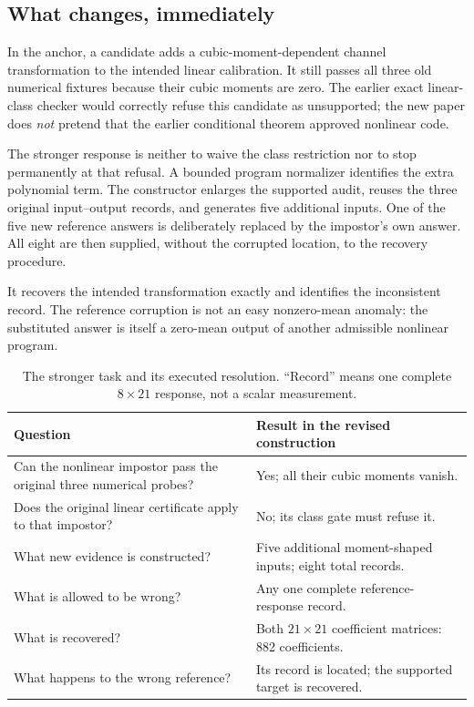 \documentclass[11pt,letterpaper]{article}
\theoremstyle{remark}\newtheorem{remark}{Remark}[section]
\begin{document}
\subsection{What changes, immediately}
In the anchor, a candidate adds a cubic-moment-dependent channel transformation to the intended linear calibration. It still passes all three old numerical fixtures because their cubic moments are zero. The earlier exact linear-class checker would correctly refuse this candidate as unsupported; the new paper does \emph{not} pretend that the earlier conditional theorem approved nonlinear code.

The stronger response is neither to waive the class restriction nor to stop permanently at that refusal. A bounded program normalizer identifies the extra polynomial term. The constructor enlarges the supported audit, reuses the three original input--output records, and generates five additional inputs. One of the five new reference answers is deliberately replaced by the impostor's own answer. All eight are then supplied, without the corrupted location, to the recovery procedure.

It recovers the intended transformation exactly and identifies the inconsistent record. The reference corruption is not an easy nonzero-mean anomaly: the substituted answer is itself a zero-mean output of another admissible nonlinear program.

\begin{table}[htbp]\centering\small
\caption{The stronger task and its executed resolution. ``Record'' means one complete $8\times21$ response, not a scalar measurement.}\label{tab:opening}
\begin{tabularx}{\linewidth}{@{}YP{.40\linewidth}@{}}\toprule
Question & Result in the revised construction\\\midrule
Can the nonlinear impostor pass the original three numerical probes? & Yes; all their cubic moments vanish.\\
Does the original linear certificate apply to that impostor? & No; its class gate must refuse it.\\
What new evidence is constructed? & Five additional moment-shaped inputs; eight total records.\\
What is allowed to be wrong? & Any one complete reference-response record.\\
What is recovered? & Both $21\times21$ coefficient matrices: 882 coefficients.\\
What happens to the wrong reference? & Its record is located; the supported target is recovered.\\\bottomrule
\end{tabularx}
\end{table}
\end{document}
